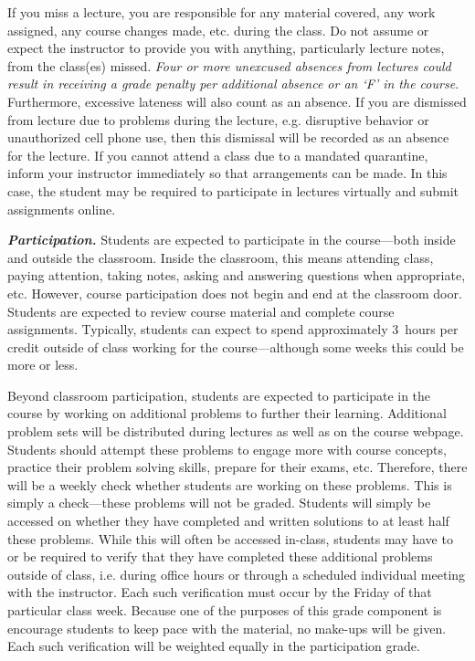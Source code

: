\documentclass[11pt,letterpaper]{article}
\begin{document}
If you miss a lecture, you are responsible for any material covered, any work assigned, any course changes made, etc. during the class. Do not assume or expect the instructor to provide you with anything, particularly lecture notes, from the class(es) missed. {\itshape Four or more unexcused absences from lectures could result in receiving a grade penalty per additional absence or an `F' in the course.} Furthermore, excessive lateness will also count as an absence. If you are dismissed from lecture due to problems during the lecture, e.g. disruptive behavior or unauthorized cell phone use, then this dismissal will be recorded as an absence for the lecture. If you cannot attend a class due to a mandated quarantine, inform your instructor immediately so that arrangements can be made. In this case, the student may be required to participate in lectures virtually and submit assignments online. \pspace

{\itshape\bfseries\color{stacred}Participation.} Students are expected to participate in the course---both inside and outside the classroom. Inside the classroom, this means attending class, paying attention, taking notes, asking and answering questions when appropriate, etc. However, course participation does not begin and end at the classroom door. Students are expected to review course material and complete course assignments. Typically, students can expect to spend approximately 3~hours per credit outside of class working for the course---although some weeks this could be more or less. \pspace

Beyond classroom participation, students are expected to participate in the course by working on additional problems to further their learning. Additional problem sets will be distributed during lectures as well as on the course webpage. Students should attempt these problems to engage more with course concepts, practice their problem solving skills, prepare for their exams, etc. Therefore, there will be a weekly check whether students are working on these problems. This is simply a check---these problems will not be graded. Students will simply be accessed on whether they have completed and written solutions to at least half these problems. While this will often be accessed in-class, students may have to or be required to verify that they have completed these additional problems outside of class, i.e. during office hours or through a scheduled individual meeting with the instructor. Each such verification must occur by the Friday of that particular class week. Because one of the purposes of this grade component is encourage students to keep pace with the material, no make-ups will be given. Each such verification will be weighted equally in the participation grade. \pspace
\end{document}
